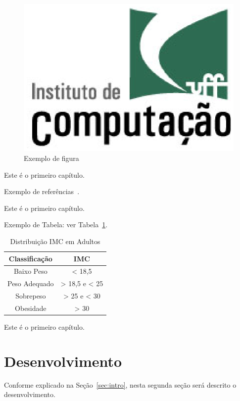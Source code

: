 \begin{figure}[!ht]
\centering
\includegraphics[width=0.3\linewidth]{figuras/exefig.eps}
\caption{Exemplo de figura}
\label{fig:exefig}
\end{figure}

Este \'e o primeiro cap\'itulo. 

Exemplo de refer\^encias~\cite{tese2011, confinter2011, confnac2011, rev2011, site2011}.

Este \'e o primeiro cap\'itulo. 

Exemplo de Tabela: ver Tabela~\ref{tab:exetab}.

\begin{table}[!ht]
\begin{center}
\caption{Distribuição IMC em Adultos}
\label{tab:exetab}
\begin{tabular}{|c |c |}
\hline
\textbf{\textbf{Classificação}} & \textbf{IMC}\\
\hline\hline
Baixo Peso & < 18,5 \\
Peso Adequado & > 18,5 e < 25 \\
Sobrepeso & > 25 e < 30 \\
Obesidade & > 30 \\
\hline
\end{tabular}
\end{center}
\end{table}

Este \'e o primeiro cap\'itulo. 
 


\section{Desenvolvimento}\label{sec:desenv}

Conforme explicado na Se\c{c}\~ao~\ref{sec:intro}, nesta segunda se\c{c}\~ao ser\'a descrito o desenvolvimento.
